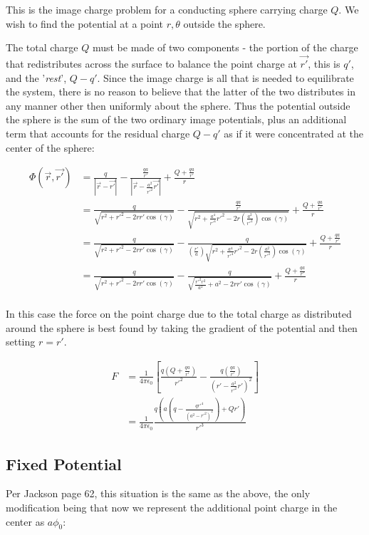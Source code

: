 \documentclass[paper=a4, fontsize=11pt]{scrartcl} %
\newcommand{\kay}{\frac{1}{4 \pi \epsilon_0}}
\newcommand{\scrr}{\vec{r} - \vec{r'}}
\numberwithin{equation}{section} %
\numberwithin{figure}{section} %
\numberwithin{table}{section} %
\begin{document}
This is the image charge problem for a conducting sphere carrying charge $Q$. We wish to find the potential at a point $r,\theta$ outside the sphere.

\hspace{2mm} 

The total charge $Q$ must be made of two components - the portion of the charge that redistributes across the surface to balance the point charge at $\vec{r'}$, this is $q'$, and the '\textit{rest}', $Q - q'$. Since the image charge is all that is needed to equilibrate the system, there is no reason to believe that the latter of the two distributes in any manner other then uniformly about the sphere. Thus the potential outside the sphere is the sum of the two ordinary image potentials, plus an additional term that accounts for the residual charge $Q-q'$ as if it were concentrated at the center of the sphere:

\begin{align}
\Phi(\vec{r},\vec{r'}) &= \frac{q}{|\scrr|} - \frac{\frac{q a}{r'}}{|\vec{r} - \frac{a^2}{r'^2}\vec{r'}|} + \frac{Q + \frac{q a}{r'}}{r} \\
&= \frac{q}{\sqrt{r^2 + r'^2 - 2rr'\cos(\gamma)}} - \frac{\frac{qa}{r'}}{\sqrt{r^2 + \frac{a^4}{r'^4}r'^2 - 2 r \left(\frac{a^2}{r'^2}\right)\cos(\gamma)}} + \frac{Q + \frac{qa}{r'}}{r} \\
&= \frac{q}{\sqrt{r^2 + r'^2 - 2rr'\cos(\gamma)}} - \frac{q}{\left(\frac{r'}{a}\right)\sqrt{r^2 + \frac{a^4}{r'^4}r'^2 - 2 r \left(\frac{a^2}{r'^2}\right)\cos(\gamma)}} + \frac{Q + \frac{qa}{r'}}{r} \\
&= \frac{q}{\sqrt{r^2 + r'^2 - 2rr'\cos(\gamma)}} - \frac{q}{\sqrt{\frac{r'^2r^2}{a^2} + a^2 - 2 r r'\cos(\gamma)}} + \frac{Q + \frac{qa}{r'}}{r} \\
\end{align} 

In this case the force on the point charge due to the total charge as distributed around the sphere is best found by taking the gradient of the potential and then setting $r = r'$. 

\begin{align}
F &= \kay \left[\frac{q\left(Q + \frac{q a}{r'}\right)}{r'^2} - \frac{q\left(\frac{qa}{r'}\right)}{\left(r'- \frac{a^2}{r'^2}r'\right)^2}\right] \\
&= \kay\frac{q \left(a \left(q-\frac{q r'^4}{\left(a^2-r'^2\right)^2}\right)+Q r'\right)}{r'^3} 
\end{align}

\subsection{Fixed Potential}
Per Jackson page 62, this situation is the same as the above, the only modification being that now we represent the additional point charge in the center as $a\phi_0$:
\end{document}
